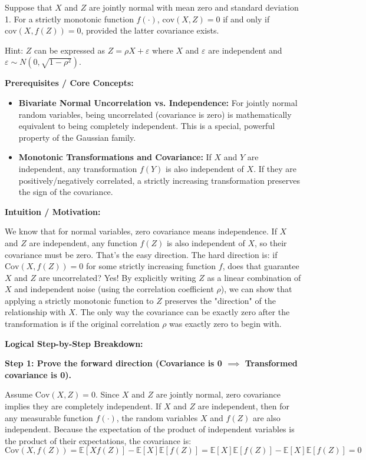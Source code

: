 \begin{exercise}\label{probability:2015:9}
Suppose that $X$ and $Z$ are jointly normal with mean zero and standard deviation 1. For a strictly monotonic function $f(\cdot)$, $\mathrm{cov}(X, Z) = 0$ if and only if $\mathrm{cov}(X, f(Z)) = 0$, provided the latter covariance exists.

Hint: $Z$ can be expressed as $Z = \rho X + \varepsilon$ where $X$ and $\varepsilon$ are independent and $\varepsilon \sim N(0, \sqrt{1-\rho^2})$.
\end{exercise}

\begin{solution}
\textbf{Prerequisites / Core Concepts:}
\begin{itemize}
    \item \textbf{Bivariate Normal Uncorrelation vs. Independence:} For jointly normal random variables, being uncorrelated (covariance is zero) is mathematically equivalent to being completely independent. This is a special, powerful property of the Gaussian family.
    \item \textbf{Monotonic Transformations and Covariance:} If $X$ and $Y$ are independent, any transformation $f(Y)$ is also independent of $X$. If they are positively/negatively correlated, a strictly increasing transformation preserves the sign of the covariance.
\end{itemize}

\textbf{Intuition / Motivation:}

We know that for normal variables, zero covariance means independence. If $X$ and $Z$ are independent, any function $f(Z)$ is also independent of $X$, so their covariance must be zero. That's the easy direction. The hard direction is: if $\text{Cov}(X, f(Z)) = 0$ for some strictly increasing function $f$, does that guarantee $X$ and $Z$ are uncorrelated? Yes! By explicitly writing $Z$ as a linear combination of $X$ and independent noise (using the correlation coefficient $\rho$), we can show that applying a strictly monotonic function to $Z$ preserves the "direction" of the relationship with $X$. The only way the covariance can be exactly zero after the transformation is if the original correlation $\rho$ was exactly zero to begin with.

\textbf{Logical Step-by-Step Breakdown:}

\textbf{Step 1: Prove the forward direction (Covariance is 0 $\implies$ Transformed covariance is 0).}

Assume $\text{Cov}(X, Z) = 0$. Since $X$ and $Z$ are jointly normal, zero covariance implies they are completely independent.
If $X$ and $Z$ are independent, then for any measurable function $f(\cdot)$, the random variables $X$ and $f(Z)$ are also independent.
Because the expectation of the product of independent variables is the product of their expectations, the covariance is:
\[ \text{Cov}(X, f(Z)) = \mathbb{E}[X f(Z)] - \mathbb{E}[X]\mathbb{E}[f(Z)] = \mathbb{E}[X]\mathbb{E}[f(Z)] - \mathbb{E}[X]\mathbb{E}[f(Z)] = 0 \]


\end{solution}
